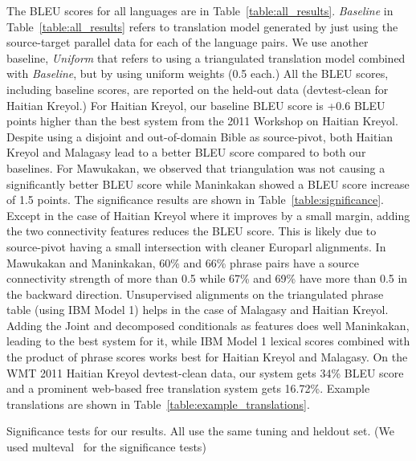 \documentclass[11pt]{article}
\begin{document}
	The BLEU scores for all languages are in Table~\ref{table:all_results}. \emph{Baseline} in Table~\ref{table:all_results} refers to translation model generated by just using the source-target parallel data for each of the language pairs. We use another baseline, \emph{Uniform} that refers to using a triangulated translation model combined with \emph{Baseline}, but by using uniform weights (0.5 each.) All the BLEU scores, including baseline scores, are reported on the held-out data (devtest-clean for Haitian Kreyol.) For Haitian Kreyol, our baseline BLEU score is +0.6 BLEU points higher than the best system from the 2011 Workshop on Haitian Kreyol.   
	Despite using a disjoint and out-of-domain Bible as source-pivot, both Haitian Kreyol and Malagasy lead to a better BLEU score compared to both our baselines. For Mawukakan, we observed that triangulation was not causing a significantly better BLEU score while Maninkakan showed a BLEU score increase of 1.5 points. The significance results are shown in Table~\ref{table:significance}. 
	Except in the case of Haitian Kreyol where it improves by a small margin, adding the two connectivity features reduces the BLEU score. This is likely due to source-pivot having a small intersection with cleaner Europarl alignments. In Mawukakan and Maninkakan, 60\% and 66\% phrase pairs have a source connectivity strength of more than 0.5 while 67\% and 69\% have more than 0.5 in the backward direction.
Unsupervised alignments on the triangulated phrase table (using IBM Model 1) helps in the case of Malagasy and Haitian Kreyol. Adding the Joint and decomposed conditionals as features does well Maninkakan, leading to the best system for it, while IBM Model 1 lexical scores combined with the product of phrase scores works best for Haitian Kreyol and Malagasy. On the WMT 2011 Haitian Kreyol devtest-clean data, our system gets 34\% BLEU score and a prominent web-based free translation system gets 16.72\%. Example translations are shown in Table~\ref{table:example_translations}. 
		\begin{table}
		\centering
			{
			
			}
			\caption{Significance tests for our results. All use the same tuning and heldout set. (We used multeval~\cite{Clark:11} for the significance tests)}
			\label{table:significance}
		\end{table}
\end{document}
